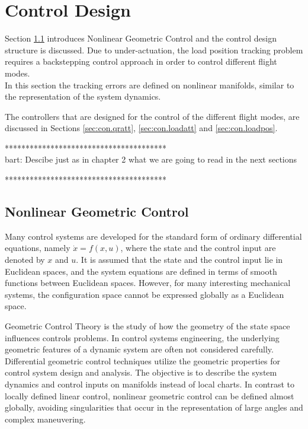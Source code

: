 \chapter{Control Design} \label{ch:control}
Section \ref{sec:con.nlgc} introduces Nonlinear Geometric Control and the control design structure is discussed. Due to under-actuation, the load position tracking problem requires a backstepping control approach in order to control different flight modes.\\
In this section the tracking errors are defined on nonlinear manifolds, similar to the representation of the system dynamics.

The controllers that are designed for the control of the different flight modes, are discussed in Sections \ref{sec:con.qratt}, \ref{sec:con.loadatt} and \ref{sec:con.loadpos}. 



***************************************\\
bart: Descibe just as in chapter 2 what we are going to read in the next sections

***************************************\\

\section{Nonlinear Geometric Control}\label{sec:con.nlgc}
Many control systems are developed for the standard form of ordinary differential equations, namely $ \dot{x}=f(x,u) $, where the state and the control input are denoted by $ x $ and $ u $. It is assumed that the state and the control input lie in Euclidean spaces, and the system equations are defined in terms of smooth functions between Euclidean spaces. However, for many interesting mechanical systems, the configuration space cannot be expressed globally as a Euclidean space.

Geometric Control Theory is the study of how the geometry of the state space influences controls problems. 
In control systems engineering, the underlying geometric features of a dynamic system are often not considered carefully. 
Differential geometric control techniques utilize the geometric properties for control system design and analysis.
The objective is to describe the system dynamics and control inputs on manifolds instead of local charts. In contrast to locally defined linear control, nonlinear geometric control can be defined almost globally, avoiding singularities that occur in the representation of large angles and complex maneuvering.

